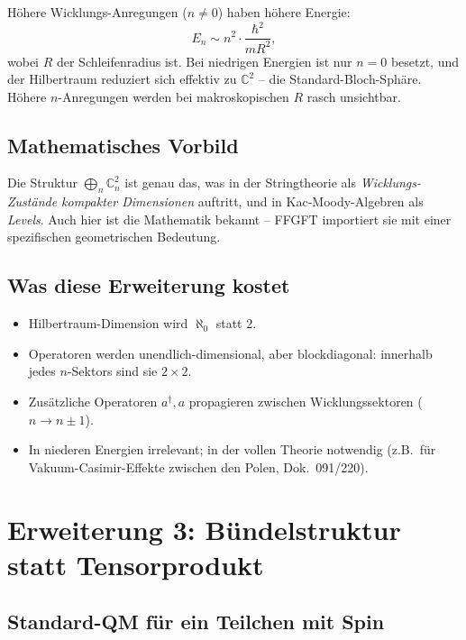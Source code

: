 Höhere Wicklungs-Anregungen ($n \neq 0$) haben höhere Energie:
\begin{equation}
  E_n \sim n^2 \cdot \frac{\hbar^2}{m R^2},
\end{equation}
wobei $R$ der Schleifenradius ist. Bei niedrigen Energien ist nur
$n = 0$ besetzt, und der Hilbertraum reduziert sich effektiv zu
$\mathbb{C}^2$ -- die Standard-Bloch-Sphäre. Höhere
$n$-Anregungen werden bei makroskopischen $R$ rasch unsichtbar.

\subsection{Mathematisches Vorbild}

Die Struktur $\bigoplus_n \mathbb{C}^2_n$ ist genau das, was in der
Stringtheorie als \emph{Wicklungs-Zustände kompakter Dimensionen}
auftritt, und in Kac-Moody-Algebren als \emph{Levels}. Auch hier ist
die Mathematik bekannt -- FFGFT importiert sie mit einer
spezifischen geometrischen Bedeutung.

\subsection{Was diese Erweiterung kostet}

\begin{itemize}[leftmargin=2em,itemsep=2pt,topsep=2pt]
  \item Hilbertraum-Dimension wird $\aleph_0$ statt $2$.
  \item Operatoren werden unendlich-dimensional, aber blockdiagonal:
        innerhalb jedes $n$-Sektors sind sie $2\times 2$.
  \item Zusätzliche Operatoren $a^\dagger, a$ propagieren zwischen
        Wicklungssektoren ($n \to n \pm 1$).
  \item In niederen Energien irrelevant; in der vollen Theorie
        notwendig (z.B.\ für Vakuum-Casimir-Effekte zwischen den
        Polen, Dok.~091/220).
\end{itemize}

\section{Erweiterung 3: Bündelstruktur statt Tensorprodukt}

\subsection{Standard-QM für ein Teilchen mit Spin}

